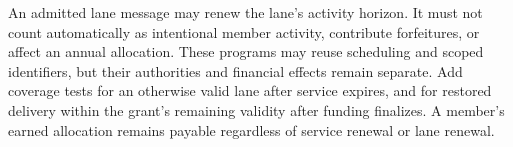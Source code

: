 \documentclass[11pt]{article}
\begin{document}
An admitted lane message may renew the lane's activity horizon. It must not count
automatically as intentional member activity, contribute forfeitures, or affect an
annual allocation. These programs may reuse scheduling and scoped identifiers,
but their authorities and financial effects remain separate. Add coverage tests
for an otherwise valid lane after service expires, and for restored delivery
within the grant's remaining validity after funding finalizes. A member's earned
allocation remains payable regardless of service renewal or lane renewal.
\end{document}
